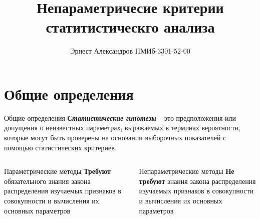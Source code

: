 \documentclass{beamer}
\title{Непараметричесие критерии\\
статитистическго анализа}
\author{Эрнест Александров ПМИб-3301-52-00}
\date{}
\institute{ВятГУ, 2024}
\begin{document}

\begin{frame}
    \titlepage
\end{frame}

\begin{frame}{}
    \tableofcontents[currentsections]
\end{frame}

\section{Общие определения}
\begin{frame}{Общие определения}
    \textbf{\textit{Статистические гипотезы}} – это предположения или допущения о неизвестных параметрах, выражаемых в терминах вероятности, которые могут быть проверены на основании выборочных показателей с помощью статистических критериев.
    
    \begin{columns}
        \pause
            \begin{block}{Параметрические методы}
            \textbf{Требуют} обязательного знания закона распределения изучаемых признаков в совокупности и вычисления их основных параметров
            \end{block}
        \pause
            \begin{block}{Непараметрические методы}
            \textbf{Не требуют} знания закона распределения изучаемых признаков в совокупности и вычисления их основных параметров
            \end{block}       
    \end{columns}
\end{frame}
\end{document}
